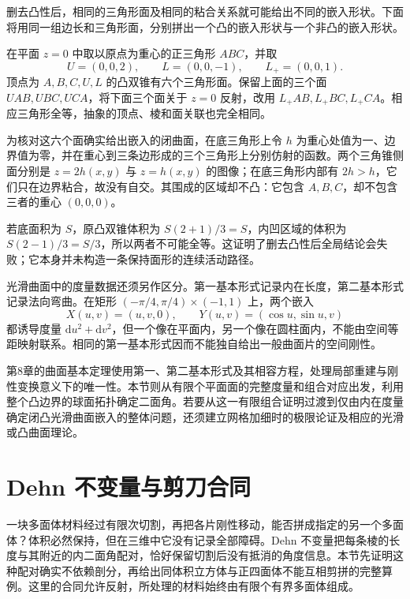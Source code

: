 删去凸性后，相同的三角形面及相同的粘合关系就可能给出不同的嵌入形状。下面将用同一组边长和三角形面，分别拼出一个凸的嵌入形状与一个非凸的嵌入形状。

\begin{example}\label{g1:exm:cauchy-nonconvex-pair}
	在平面 \(z=0\) 中取以原点为重心的正三角形 \(ABC\)，并取
	\[
		U=(0,0,2),\qquad L=(0,0,-1),\qquad L_+=(0,0,1).
	\]
	顶点为 \(A,B,C,U,L\) 的凸双锥有六个三角形面。保留上面的三个面 \(UAB,UBC,UCA\)，将下面三个面关于 \(z=0\) 反射，改用 \(L_+AB,L_+BC,L_+CA\)。相应三角形全等，抽象的顶点、棱和面关联也完全相同。

	\ProseParagraphBreak

	为核对这六个面确实给出嵌入的闭曲面，在底三角形上令 \(h\) 为重心处值为一、边界值为零，并在重心到三条边形成的三个三角形上分别仿射的函数。两个三角锥侧面分别是 \(z=2h(x,y)\) 与 \(z=h(x,y)\) 的图像；在底三角形内部有 \(2h>h\)，它们只在边界粘合，故没有自交。其围成的区域却不凸：它包含 \(A,B,C\)，却不包含三者的重心 \((0,0,0)\)。

	\ProseParagraphBreak

	若底面积为 \(S\)，原凸双锥体积为 \(S(2+1)/3=S\)，内凹区域的体积为 \(S(2-1)/3=S/3\)，所以两者不可能全等。这证明了删去凸性后全局结论会失败；它本身并未构造一条保持面形的连续活动路径。
\end{example}

光滑曲面中的度量数据还须另作区分。第一基本形式记录内在长度，第二基本形式记录法向弯曲。在矩形 \((-\pi/4,\pi/4)\times(-1,1)\) 上，两个嵌入
\[
	X(u,v)=(u,v,0),\qquad Y(u,v)=(\cos u,\sin u,v)
\]
都诱导度量 \(\mathrm du^2+\mathrm dv^2\)，但一个像在平面内，另一个像在圆柱面内，不能由空间等距映射联系。相同的第一基本形式因而不能独自给出一般曲面片的空间刚性。

\ProseParagraphBreak

第8章的曲面基本定理使用第一、第二基本形式及其相容方程，处理局部重建与刚性变换意义下的唯一性。本节则从有限个平面面的完整度量和组合对应出发，利用整个凸边界的球面拓扑确定二面角。若要从这一有限组合证明过渡到仅由内在度量确定闭凸光滑曲面嵌入的整体问题，还须建立网格加细时的极限论证及相应的光滑或凸曲面理论。

\section{Dehn 不变量与剪刀合同}
\label{g1:sec:E05}

一块多面体材料经过有限次切割，再把各片刚性移动，能否拼成指定的另一个多面体？体积必然保持，但在三维中它没有记录全部障碍。Dehn 不变量把每条棱的长度与其附近的内二面角配对，恰好保留切割后没有抵消的角度信息。本节先证明这种配对确实不依赖剖分，再给出同体积立方体与正四面体不能互相剪拼的完整算例。这里的合同允许反射，所处理的材料始终由有限个有界多面体组成。

